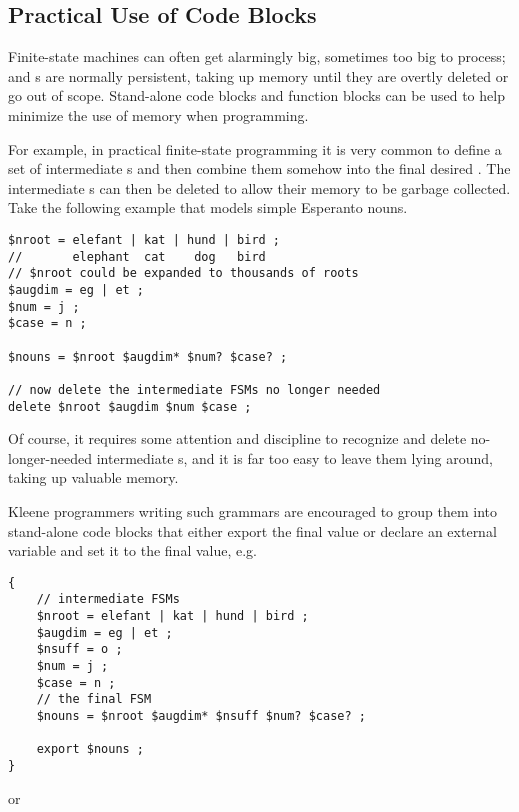 \subsection{Practical Use of Code Blocks}

\label{sec:codeblock}

Finite-state machines can often get alarmingly big, sometimes too big to
process; and \fsm{}s are normally persistent, taking up memory until
they are overtly deleted or go out of scope.  Stand-alone code blocks and function blocks
can be used to help minimize the use of memory when programming.

For example, in practical finite-state programming it is very common to
define a set of intermediate \fsm{}s and then combine them somehow into
the final desired \fsm{}.  The intermediate \fsm{}s can then be deleted
to allow their memory to be garbage collected.  Take the following
example that models simple Esperanto nouns.

\begin{Verbatim}
$nroot = elefant | kat | hund | bird ;  
//       elephant  cat    dog   bird
// $nroot could be expanded to thousands of roots
$augdim = eg | et ;
$num = j ;
$case = n ;

$nouns = $nroot $augdim* $num? $case? ;

// now delete the intermediate FSMs no longer needed
delete $nroot $augdim $num $case ;
\end{Verbatim}

\noindent
Of course, it requires some attention and discipline
to recognize and delete no-longer-needed intermediate \fsm{}s,
and it is far too easy to leave them lying around, taking up valuable memory.  

Kleene programmers writing such grammars are encouraged to group them into stand-alone 
code blocks that
either export the final value or declare an external variable and set it to the final
value, e.g.

\begin{samepage}
\begin{Verbatim}
{
    // intermediate FSMs 
    $nroot = elefant | kat | hund | bird ;
    $augdim = eg | et ;
    $nsuff = o ;
    $num = j ;
    $case = n ;
    // the final FSM 
    $nouns = $nroot $augdim* $nsuff $num? $case? ;

    export $nouns ;
}
\end{Verbatim}
\end{samepage}

\noindent
or


